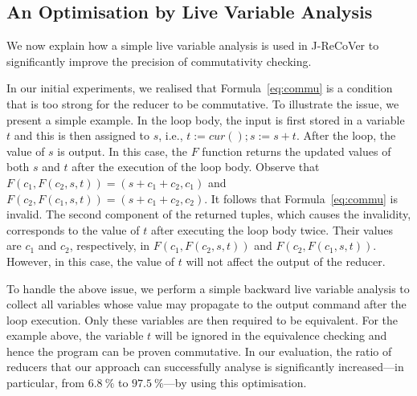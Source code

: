 \documentclass{llncs}
\newcommand{\cur}{cur()}
\begin{document}
\vspace{-2mm}
\subsection{An Optimisation by Live Variable Analysis}
\vspace{-2mm}
\label{section:optimizations}

We now explain how a simple live variable analysis is used in J-ReCoVer to
significantly improve the precision of commutativity checking.

In our initial experiments, we realised that Formula~\ref{eq:commu} is a
condition that is too strong for the reducer to be commutative. To illustrate
the issue, we present a simple example. In the loop body, the input is first
stored in a variable $t$ and this is then assigned to $s$, i.e., $t:=\cur;s:=s+t$.
After the loop, the value of $s$ is output. In this case, the $F$ function
returns the updated values of both $s$ and $t$ after the execution of the loop
body. Observe that $F(c_1, F(c_2,s,t)) = (s+c_1+c_2, c_1)$ and $F(c_2, F(c_1,s,t))
= (s+c_1+c_2, c_2)$. It follows that Formula~\ref{eq:commu} is invalid. The second
component of the returned tuples, which causes the invalidity, corresponds to
the value of $t$ after executing the loop body twice. Their values are $c_1$ and
$c_2$, respectively, in $F(c_1, F(c_2,s,t))$ and $F(c_2, F(c_1,s,t))$. However,
in this case, the value of $t$ will not affect the output of the reducer.

To handle the above issue, we perform a simple backward live variable analysis
to collect all variables whose value may propagate to the output command after
the loop execution. Only these variables are then required to be equivalent. For the example above, the variable $t$ will be ignored in the equivalence checking and hence the program can be proven commutative. In
our evaluation, the ratio of reducers that our approach can successfully analyse
is significantly increased---in particular, from $6.8~\%$ to $97.5~\%$---by
using this optimisation. 
\end{document}
